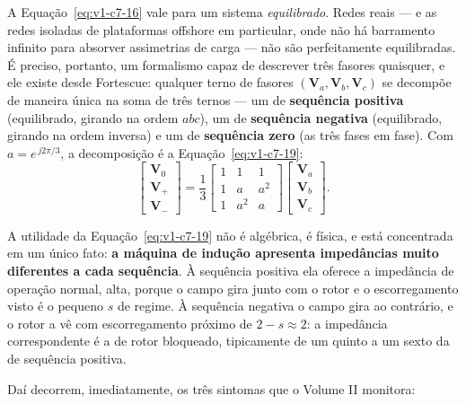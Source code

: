 \documentclass[12pt,a4paper]{article}
\numberwithin{equation}{section}
\numberwithin{table}{section}
\numberwithin{figure}{section}
\begin{document}
A Equação~\eqref{eq:v1-c7-16} vale para um sistema \emph{equilibrado}. Redes
reais --- e as redes isoladas de plataformas offshore em particular, onde não
há barramento infinito para absorver assimetrias de carga --- não são
perfeitamente equilibradas. É preciso, portanto, um formalismo capaz de
descrever três fasores quaisquer, e ele existe desde Fortescue: qualquer terno
de fasores $(\mathbf{V}_a,\mathbf{V}_b,\mathbf{V}_c)$ se decompõe de maneira
única na soma de três ternos --- um de \textbf{sequência positiva}
(equilibrado, girando na ordem $abc$), um de \textbf{sequência negativa}
(equilibrado, girando na ordem inversa) e um de \textbf{sequência zero} (as
três fases em fase). Com $a = e^{\,j2\pi/3}$, a decomposição é a
Equação~\eqref{eq:v1-c7-19}:
\begin{equation}\label{eq:v1-c7-19}
\begin{bmatrix}\mathbf{V}_0\\ \mathbf{V}_+\\ \mathbf{V}_-\end{bmatrix}
= \frac{1}{3}
\begin{bmatrix}
1 & 1 & 1\\
1 & a & a^2\\
1 & a^2 & a
\end{bmatrix}
\begin{bmatrix}\mathbf{V}_a\\ \mathbf{V}_b\\ \mathbf{V}_c\end{bmatrix} .
\end{equation}

A utilidade da Equação~\eqref{eq:v1-c7-19} não é algébrica, é física, e está
concentrada em um único fato: \textbf{a máquina de indução apresenta impedâncias
muito diferentes a cada sequência}. À sequência positiva ela oferece a
impedância de operação normal, alta, porque o campo gira junto com o rotor e o
escorregamento visto é o pequeno $s$ de regime. À sequência negativa o campo
gira ao contrário, e o rotor a vê com escorregamento próximo de $2-s\approx2$:
a impedância correspondente é a de rotor bloqueado, tipicamente de um quinto a
um sexto da de sequência positiva.

Daí decorrem, imediatamente, os três sintomas que o Volume II monitora:
\end{document}
